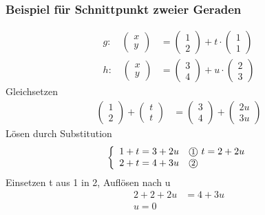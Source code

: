 \documentclass[a4paper]{article}
\begin{document}
\subsubsection{Beispiel für Schnittpunkt zweier Geraden}
\begin{align*}
g: \quad \begin{pmatrix}x\\y\end{pmatrix}&=\begin{pmatrix}1\\2\end{pmatrix}+t\cdot \begin{pmatrix}1\\1\end{pmatrix}\\
h: \quad \begin{pmatrix}x\\y\end{pmatrix}&=\begin{pmatrix}3\\4\end{pmatrix}+u\cdot \begin{pmatrix}2\\3\end{pmatrix}
\end{align*}
Gleichsetzen
\begin{align*}
\begin{pmatrix}1\\2\end{pmatrix}+\begin{pmatrix}t\\t\end{pmatrix}&=\begin{pmatrix}3\\4\end{pmatrix}+\begin{pmatrix}2u\\3u\end{pmatrix}
\end{align*}
Lösen durch Substitution
\[
\left\{
\begin{array}{ll}
1+t=3+2u & \text{\textcircled{\footnotesize{1}} } t=2+2u\\
2+t=4+3u & \text{\textcircled{\footnotesize{2}} }
\end{array}
\right.
\]
Einsetzen t aus \textcircled{\footnotesize{1}} in \textcircled{\footnotesize{2}}, Auflösen nach u
\begin{align*}
2+2+2u&=4+3u \\
u=0
\end{align*}
\end{document}
